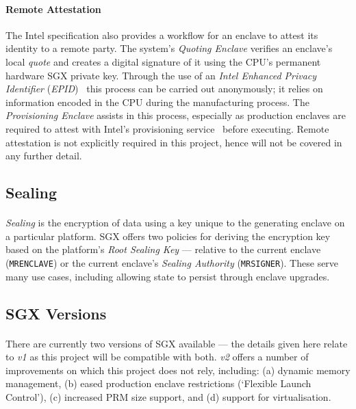 \paragraph{Remote Attestation} The Intel specification also provides a workflow for an enclave to attest its identity to a remote party. The system's \textit{Quoting Enclave} verifies an enclave's local \textit{quote} and creates a digital signature of it using the CPU's permanent hardware SGX private key. Through the use of an \textit{Intel Enhanced Privacy Identifier} (\textit{EPID})~\cite{epid} this process can be carried out anonymously; it relies on information encoded in the CPU during the manufacturing process. The \textit{Provisioning Enclave} assists in this process, especially as production enclaves are required to attest with Intel's provisioning service~\cite{sgx-prov-service} before executing. Remote attestation is not explicitly required in this project, hence will not be covered in any further detail.

\subsection{Sealing}
\label{sec:sealing}
\paragraph{} \textit{Sealing} is the encryption of data using a key unique to the generating enclave on a particular platform. SGX offers two policies for deriving the encryption key based on the platform's \textit{Root Sealing Key} --- relative to the current enclave (\texttt{MRENCLAVE}) or the current enclave's \textit{Sealing Authority} (\texttt{MRSIGNER}). These serve many use cases, including allowing state to persist through enclave upgrades.

\subsection{SGX Versions}
\label{sec:sgx-versions}
\paragraph{} There are currently two versions of SGX available --- the details given here relate to \textit{v1} as this project will be compatible with both. \textit{v2} offers a number of improvements on which this project does not rely, including: (a) dynamic memory management, (b) eased production enclave restrictions (`Flexible Launch Control'), (c) increased PRM size support, and (d) support for virtualisation.


